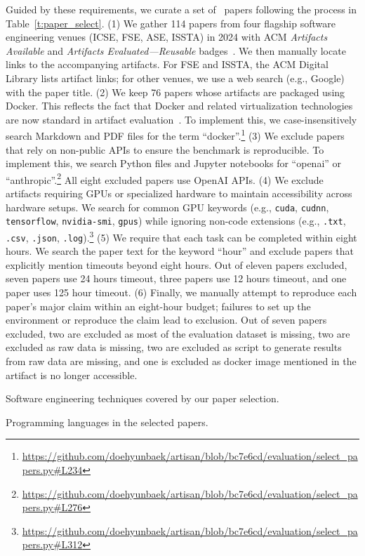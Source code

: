 Guided by these requirements, we curate a set of \papersetsize~papers following the process in Table~\ref{t:paper_select}.
(1) We gather 114 papers from four flagship software engineering venues (ICSE, FSE, ASE, ISSTA) in 2024 with ACM \emph{Artifacts Available} and \emph{Artifacts Evaluated—Reusable} badges~\cite{acm-artifact-badging-v1_1}.
We then manually locate links to the accompanying artifacts.
For FSE and ISSTA, the ACM Digital Library lists artifact links; for other venues, we use a web search (e.g., Google) with the paper title.
(2) We keep 76 papers whose artifacts are packaged using Docker.
This reflects the fact that Docker and related virtualization technologies are now standard in artifact evaluation~\cite{icse2024-ae,fse2024-ae,ase2024-ae}.
To implement this, we case-insensitively search Markdown and PDF files for the term ``docker''.\footnote{\url{https://github.com/doehyunbaek/artisan/blob/bc7e6cd/evaluation/select_papers.py\#L234}}
(3) We exclude papers that rely on non-public APIs to ensure the benchmark is reproducible.
To implement this, we search Python files and Jupyter notebooks for ``openai'' or ``anthropic''.\footnote{\url{https://github.com/doehyunbaek/artisan/blob/bc7e6cd/evaluation/select_papers.py\#L276}}
All eight excluded papers use OpenAI APIs.
(4) We exclude artifacts requiring GPUs or specialized hardware to maintain accessibility across hardware setups.
We search for common GPU keywords (e.g., \texttt{cuda}, \texttt{cudnn}, \texttt{tensorflow}, \texttt{nvidia-smi}, \texttt{gpus}) while ignoring non-code extensions (e.g., \texttt{.txt}, \texttt{.csv}, \texttt{.json}, \texttt{.log}).\footnote{\url{https://github.com/doehyunbaek/artisan/blob/bc7e6cd/evaluation/select_papers.py\#L312}}
(5) We require that each task can be completed within eight hours.
We search the paper text for the keyword ``hour'' and exclude papers that explicitly mention timeouts beyond eight hours.
Out of eleven papers excluded, seven papers use 24 hours timeout, three papers use 12 hours timeout, and one paper uses 125 hour timeout.
(6) Finally, we manually attempt to reproduce each paper’s major claim within an eight-hour budget; failures to set up the environment or reproduce the claim lead to exclusion.
Out of seven papers excluded, two are excluded as most of the evaluation dataset is missing, two are excluded as raw data is missing, two are excluded as script to generate results from raw data are missing, and one is excluded as docker image mentioned in the artifact is no longer accessible.

\begin{table}[t]
  \centering
  \begin{minipage}[t]{0.48\textwidth}
    \centering
    \caption{Software engineering techniques covered by our paper selection.}
    \label{t:topics}
    
  \end{minipage}\hfill
  \begin{minipage}[t]{0.48\textwidth}
    \centering
    \caption{Programming languages in the selected papers.}
    \label{t:languages}
    
  \end{minipage}
\end{table}

